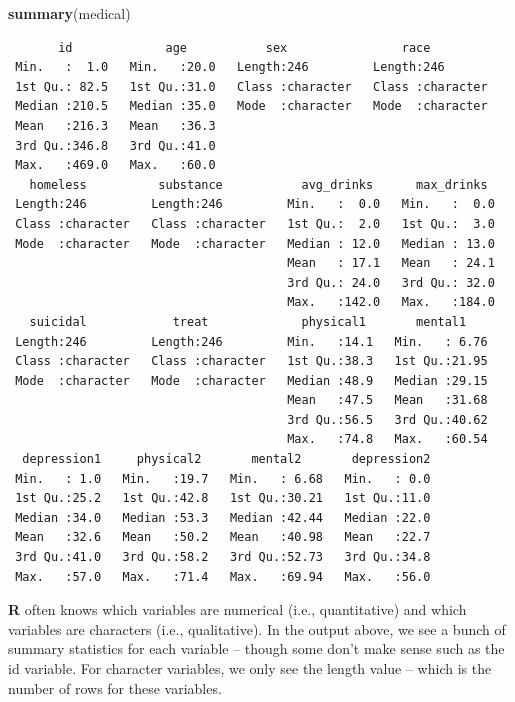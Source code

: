 \documentclass[]{book}
\newenvironment{Shaded}{\begin{snugshade}}{\end{snugshade}}
\newcommand{\KeywordTok}[1]{\textcolor[rgb]{0.13,0.29,0.53}{\textbf{#1}}}
\newcommand{\NormalTok}[1]{#1}
\begin{document}
\begin{Shaded}
\begin{Highlighting}[]
\KeywordTok{summary}\NormalTok{(medical)}
\end{Highlighting}
\end{Shaded}

\begin{verbatim}
       id             age           sex                race          
 Min.   :  1.0   Min.   :20.0   Length:246         Length:246        
 1st Qu.: 82.5   1st Qu.:31.0   Class :character   Class :character  
 Median :210.5   Median :35.0   Mode  :character   Mode  :character  
 Mean   :216.3   Mean   :36.3                                        
 3rd Qu.:346.8   3rd Qu.:41.0                                        
 Max.   :469.0   Max.   :60.0                                        
   homeless          substance           avg_drinks      max_drinks   
 Length:246         Length:246         Min.   :  0.0   Min.   :  0.0  
 Class :character   Class :character   1st Qu.:  2.0   1st Qu.:  3.0  
 Mode  :character   Mode  :character   Median : 12.0   Median : 13.0  
                                       Mean   : 17.1   Mean   : 24.1  
                                       3rd Qu.: 24.0   3rd Qu.: 32.0  
                                       Max.   :142.0   Max.   :184.0  
   suicidal            treat             physical1       mental1     
 Length:246         Length:246         Min.   :14.1   Min.   : 6.76  
 Class :character   Class :character   1st Qu.:38.3   1st Qu.:21.95  
 Mode  :character   Mode  :character   Median :48.9   Median :29.15  
                                       Mean   :47.5   Mean   :31.68  
                                       3rd Qu.:56.5   3rd Qu.:40.62  
                                       Max.   :74.8   Max.   :60.54  
  depression1     physical2       mental2       depression2  
 Min.   : 1.0   Min.   :19.7   Min.   : 6.68   Min.   : 0.0  
 1st Qu.:25.2   1st Qu.:42.8   1st Qu.:30.21   1st Qu.:11.0  
 Median :34.0   Median :53.3   Median :42.44   Median :22.0  
 Mean   :32.6   Mean   :50.2   Mean   :40.98   Mean   :22.7  
 3rd Qu.:41.0   3rd Qu.:58.2   3rd Qu.:52.73   3rd Qu.:34.8  
 Max.   :57.0   Max.   :71.4   Max.   :69.94   Max.   :56.0  
\end{verbatim}

\textbf{R} often knows which variables are numerical (i.e., quantitative) and which variables are characters (i.e., qualitative). In the output above, we see a bunch of summary statistics for each variable -- though some don't make sense such as the id variable. For character variables, we only see the length value -- which is the number of rows for these variables.
\end{document}
